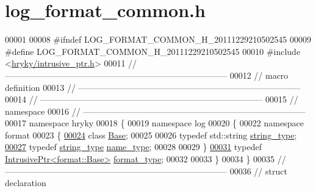 \hypertarget{log__format__common_8h_source}{\section{log\-\_\-format\-\_\-common.\-h}
}

\begin{DoxyCode}
00001 
00008 \textcolor{preprocessor}{#ifndef LOG\_FORMAT\_COMMON\_H\_20111229210502545}
00009 \textcolor{preprocessor}{}\textcolor{preprocessor}{#define LOG\_FORMAT\_COMMON\_H\_20111229210502545}
00010 \textcolor{preprocessor}{}\textcolor{preprocessor}{#include <\hyperlink{intrusive__ptr_8h}{hryky/intrusive_ptr.h}>}
00011 \textcolor{comment}{//
      ------------------------------------------------------------------------------}
00012 \textcolor{comment}{// macro definition}
00013 \textcolor{comment}{//
      ------------------------------------------------------------------------------}
00014 \textcolor{comment}{//
      ------------------------------------------------------------------------------}
00015 \textcolor{comment}{// namespace}
00016 \textcolor{comment}{//
      ------------------------------------------------------------------------------}
00017 \textcolor{keyword}{namespace }hryky
00018 \{
00019 \textcolor{keyword}{namespace }log
00020 \{
00022 \textcolor{keyword}{namespace }format
00023 \{
\hypertarget{log__format__common_8h_source_l00024}{}\hyperlink{namespacehryky_1_1log_1_1format_afb3132c335cc06bc8d0004fab99eb5e4}{00024}     \textcolor{keyword}{class }\hyperlink{classhryky_1_1log_1_1format_1_1_base}{Base};
00025 
00026     \textcolor{keyword}{typedef} std::string     \hyperlink{namespacehryky_1_1log_1_1format_afb3132c335cc06bc8d0004fab99eb5e4}{string_type};
\hypertarget{log__format__common_8h_source_l00027}{}\hyperlink{namespacehryky_1_1log_1_1format_ab7408d1e2ed2d648dbf9bba69eb74288}{00027}     \textcolor{keyword}{typedef} \hyperlink{namespacehryky_1_1log_1_1format_afb3132c335cc06bc8d0004fab99eb5e4}{string_type}     \hyperlink{namespacehryky_1_1log_1_1format_ab7408d1e2ed2d648dbf9bba69eb74288}{name_type};  
00028 
00029 \}
\hypertarget{log__format__common_8h_source_l00031}{}\hyperlink{namespacehryky_1_1log_ad50448c3f934f1eacd5c1bcffe8111e1}{00031}     \textcolor{keyword}{typedef} \hyperlink{classhryky_1_1_intrusive_ptr}{IntrusivePtr<format::Base>}  \hyperlink{namespacehryky_1_1log_ad50448c3f934f1eacd5c1bcffe8111e1}{format_type};
00032 
00033 \}
00034 \}
00035 \textcolor{comment}{//
      ------------------------------------------------------------------------------}
00036 \textcolor{comment}{// struct declaration}

\end{DoxyCode}

